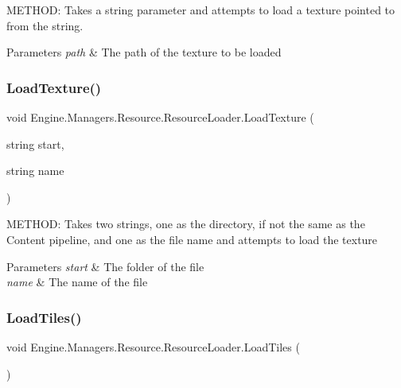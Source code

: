 M\+E\+T\+H\+OD\+: Takes a string parameter and attempts to load a texture pointed to from the string. 


\begin{DoxyParams}{Parameters}
{\em path} & The path of the texture to be loaded\\
\hline
\end{DoxyParams}
\mbox{\label{a00530_aed066679a7bd0ff5549d13323c88d4b4}} 
\subsubsection{\texorpdfstring{Load\+Texture()}{LoadTexture()}\hspace{0.1cm}{\footnotesize\ttfamily [2/2]}}
{\footnotesize\ttfamily void Engine.\+Managers.\+Resource.\+Resource\+Loader.\+Load\+Texture (\begin{DoxyParamCaption}\item[{string}]{start,  }\item[{string}]{name }\end{DoxyParamCaption})\hspace{0.3cm}{\ttfamily [inline]}}



M\+E\+T\+H\+OD\+: Takes two strings, one as the directory, if not the same as the Content pipeline, and one as the file name and attempts to load the texture 


\begin{DoxyParams}{Parameters}
{\em start} & The folder of the file\\
\hline
{\em name} & The name of the file\\
\hline
\end{DoxyParams}
\mbox{\label{a00530_a3c054651a1f23dd6a968336f2079f1b2}} 
\subsubsection{\texorpdfstring{Load\+Tiles()}{LoadTiles()}}
{\footnotesize\ttfamily void Engine.\+Managers.\+Resource.\+Resource\+Loader.\+Load\+Tiles (\begin{DoxyParamCaption}{ }\end{DoxyParamCaption})\hspace{0.3cm}{\ttfamily [inline]}}



